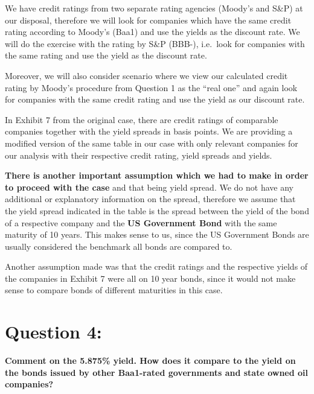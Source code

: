 \documentclass[
]{article}
\begin{document}
We have credit ratings from two separate rating agencies (Moody's and
S\&P) at our disposal, therefore we will look for companies which have
the same credit rating according to Moody's (Baa1) and use the yields as
the discount rate. We will do the exercise with the rating by S\&P
(BBB-), i.e.~look for companies with the same rating and use the yield
as the discount rate.

Moreover, we will also consider scenario where we view our calculated
credit rating by Moody's procedure from Question 1 as the ``real one''
and again look for companies with the same credit rating and use the
yield as our discount rate.

In Exhibit 7 from the original case, there are credit ratings of
comparable companies together with the yield spreads in basis points. We
are providing a modified version of the same table in our case with only
relevant companies for our analysis with their respective credit rating,
yield spreads and yields.

\textbf{There is another important assumption which we had to make in
order to proceed with the case} and that being yield spread. We do not
have any additional or explanatory information on the spread, therefore
we assume that the yield spread indicated in the table is the spread
between the yield of the bond of a respective company and the \textbf{US
Government Bond} with the same maturity of 10 years. This makes sense to
us, since the US Government Bonds are usually considered the benchmark
all bonds are compared to.

Another assumption made was that the credit ratings and the respective
yields of the companies in Exhibit 7 were all on 10 year bonds, since it
would not make sense to compare bonds of different maturities in this
case.

\hypertarget{question-4}{%
\section{Question 4:}\label{question-4}}

\textbf{Comment on the 5.875\% yield. How does it compare to the yield
on the bonds issued by other Baa1-rated governments and state owned oil
companies?}
\end{document}
